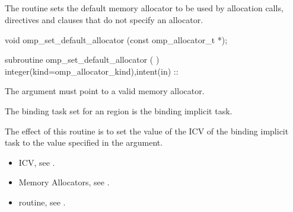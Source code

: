 \subsection{}
\label{subsec:omp_set_default_allocator}

\summary
The  routine sets the default memory allocator to be used by allocation calls,  directives and  clauses that do not specify an allocator.

\format
\begin{ccppspecific}
\begin{ompcFunction}
void omp_set_default_allocator (const omp_allocator_t *);
\end{ompcFunction}
\end{ccppspecific}
\begin{fortranspecific}
\begin{ompfSubroutine}
subroutine omp_set_default_allocator (  )
integer(kind=omp_allocator_kind),intent(in) :: 
\end{ompfSubroutine}
\end{fortranspecific}

\constraints

The  argument must point to a valid memory allocator.

\binding
The binding task set for an  region is the binding implicit task.

\effect

The effect of this routine is to set the value of the  ICV of the binding implicit task to the value specified in the  argument.

\crossreferences

\begin{itemize}
\item {} ICV, see .
\item Memory Allocators, see .
\item {} routine, see .
\end{itemize}

\subsection{}
\label{subsec:omp_get_default_allocator}

